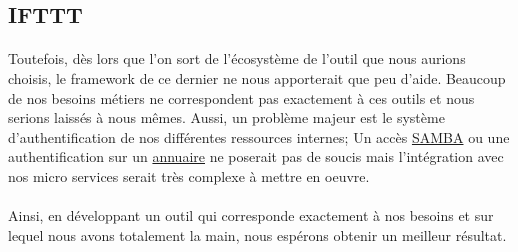 \subsection{IFTTT}

\paragraph{}
Toutefois, dès lors que l'on sort de l'écosystème de l'outil que nous aurions choisis, le framework de ce dernier ne nous apporterait que peu d'aide.
Beaucoup de nos besoins métiers ne correspondent pas exactement à ces outils et nous serions laissés à nous mêmes.
Aussi, un problème majeur est le système d'authentification de nos différentes ressources internes;
Un accès \href{https://fr.wikipedia.org/wiki/Samba_(informatique)}{SAMBA} ou
une authentification sur un \href{https://fr.wikipedia.org/wiki/Annuaire}{annuaire} ne poserait pas de soucis
mais l'intégration avec nos micro services serait très complexe à mettre en oeuvre.

\paragraph{}
Ainsi, en développant un outil qui corresponde exactement à nos besoins et sur lequel nous avons totalement la main, nous espérons obtenir un meilleur résultat.
